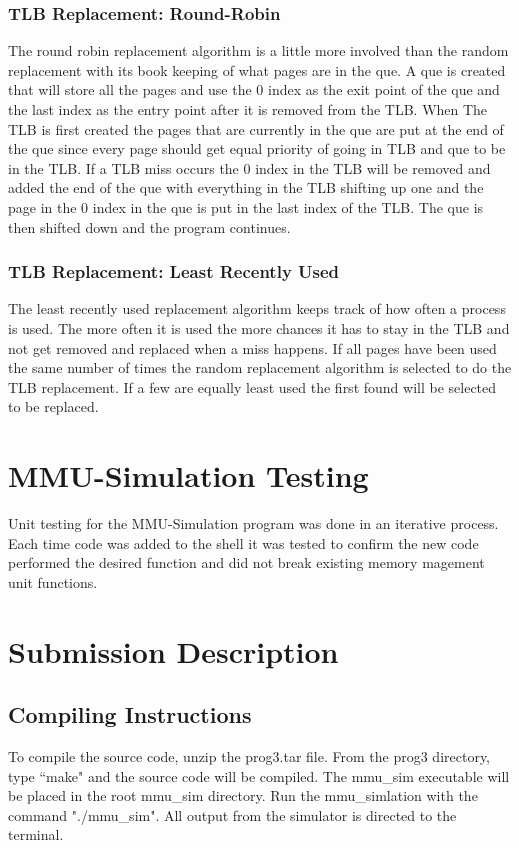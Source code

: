 \documentclass[11pt]{article}
\begin{document}
\begin{multicols}{2}
\subsubsection{TLB Replacement: Round-Robin}
The round robin replacement algorithm is a little more involved than the random replacement with its book keeping of what pages are in the que. A que is created that will store all the pages and use the 0 index as the exit point of the que and the last index as the entry point after it is removed from the TLB. When The TLB is first created the pages that are currently in the que are put at the end of the que since every page should get equal priority of going in TLB and que to be in the TLB. If a TLB miss occurs the 0 index in the TLB will be removed and added the end of the que with everything in the TLB shifting up one and the page in the 0 index in the que is put in the last index of the TLB. The que is then shifted down and the program continues. 

\subsubsection{TLB Replacement: Least Recently Used}
The least recently used replacement algorithm keeps track of how often a process is used. The more often it is used the more chances it has to stay in the TLB and not get removed and replaced when a miss happens. If all pages have been used the same number of times the random replacement algorithm is selected to do the TLB replacement. If a few are equally least used the first found will be selected to be replaced. 

\section{MMU-Simulation Testing}\label{testing}
Unit testing for the MMU-Simulation program was done in an iterative process. Each time code was added to the shell it was tested to confirm the new code performed the desired function and did not break existing memory magement unit functions. 

\section{Submission Description}\label{submission_description}
\subsection{Compiling Instructions}
To compile the source code, unzip the prog3.tar file. From the prog3 directory, type ``make" and the source code will be compiled. The mmu\_sim executable will be placed in the root mmu\_sim directory. Run the mmu\_simlation with the command "./mmu\_sim". All output from the simulator is directed to the terminal.


\end{multicols}
\end{document}
